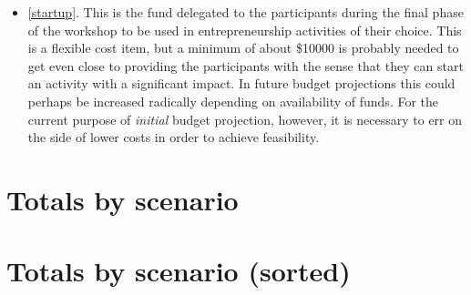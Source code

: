 \documentclass[10pt]{article}
\begin{document}
\begin{itemize}[leftmargin=*]
  \item[]{\ref{startup}. This is the fund delegated to the participants during the final phase of the workshop to be used in entrepreneurship activities of their choice. This is a flexible cost item, but a minimum of about \$10000 is probably needed to get even close to providing the participants with the sense that they can start an activity with a significant impact. In future budget projections this could perhaps be increased radically depending on availability of funds. For the current purpose of \emph{initial} budget projection, however, it is necessary to err on the side of lower costs in order to achieve feasibility.}
\end{itemize}

\section*{Totals by scenario}



\section*{Totals by scenario (sorted)}


\end{document}
